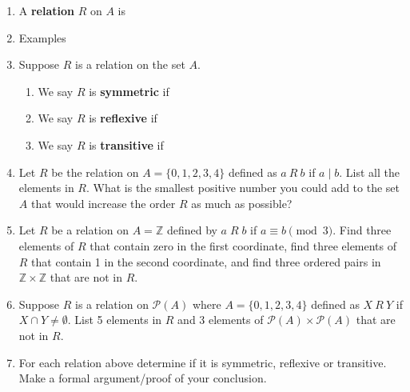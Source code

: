 \documentclass[12pt]{article}
\renewcommand{\emph}[1]{\textsf{\textbf{#1}}}
\newcommand{\Z}{\mathbb{Z}}
\begin{document}
\begin{enumerate}
\item A \emph{relation} $R$ on $A$ is 
\vfill

\item Examples
\vfill

\vfill

\item Suppose $R$ is a relation on the set $A.$
	\begin{enumerate}
	\item We say $R$ is \emph{symmetric} if 
	\vfill

	\item We say $R$ is \emph{reflexive} if 
	\vfill

	\item We say $R$ is \emph{transitive} if 
	\vfill
	\end{enumerate}
\newpage
\item Let $R$ be the relation on $A=\{0,1,2,3,4\}$ defined as $a\: R \: b$ if $a \mid b.$ List all the elements in $R$. What is the smallest positive number you could add to the set $A$ that would increase the order $R$ as much as possible?
\vfill
\item Let $R$ be a relation on $A=\Z$ defined by $a \;R\; b$ if $a \equiv b \pmod 3.$ Find three elements of $R$ that contain zero in the first coordinate, find three elements of $R$ that contain 1 in the second coordinate, and find three ordered pairs in $\Z \times \Z$ that are not in $R.$
\vfill
\item Suppose $R$ is a relation on $\mathcal{P}(A)$ where $A=\{0,1,2,3,4\}$ defined as $X \: R \: Y$ if $X \cap Y \not = \emptyset.$ List 5 elements in $R$ and 3 elements of $ \mathcal{P}(A)\times \mathcal{P}(A)$ that are not in $R.$
\vfill
\item For each relation above determine if it is symmetric, reflexive or transitive. Make a formal argument/proof of your conclusion.
\end{enumerate}
\end{document}
